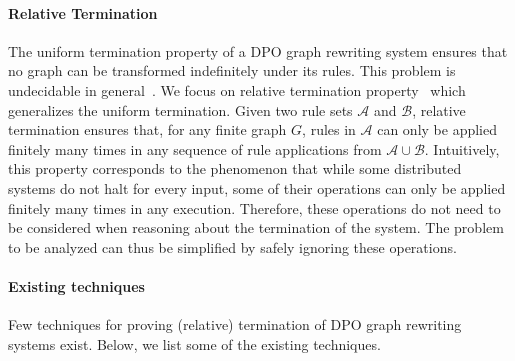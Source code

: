 \paragraph{Relative Termination}
The uniform termination property of a DPO graph rewriting system ensures that no graph can be transformed indefinitely under its rules. This problem is undecidable in general~\cite{plump1998terminationundecidable}.
We focus on relative termination property~\cite{klop1987term,geser1990relative} which generalizes the uniform termination.
 Given two rule sets \( \mathcal{A} \) and \( \mathcal{B} \), relative termination ensures that, for any finite graph $G$,
rules in $\mathcal{A}$ can only be applied finitely many times in any sequence of rule applications from $\mathcal{A} \cup \mathcal{B}$. Intuitively, this property corresponds to the phenomenon that while some distributed systems do not halt for every input, some of their operations can only be applied finitely many times in any execution. Therefore, these operations do not need to be considered when reasoning about the termination of the system. The problem to be analyzed can thus be simplified by safely ignoring these operations.

\paragraph{Existing techniques}
Few techniques for proving (relative) termination of DPO graph rewriting systems exist. Below, we list some of the existing techniques.

